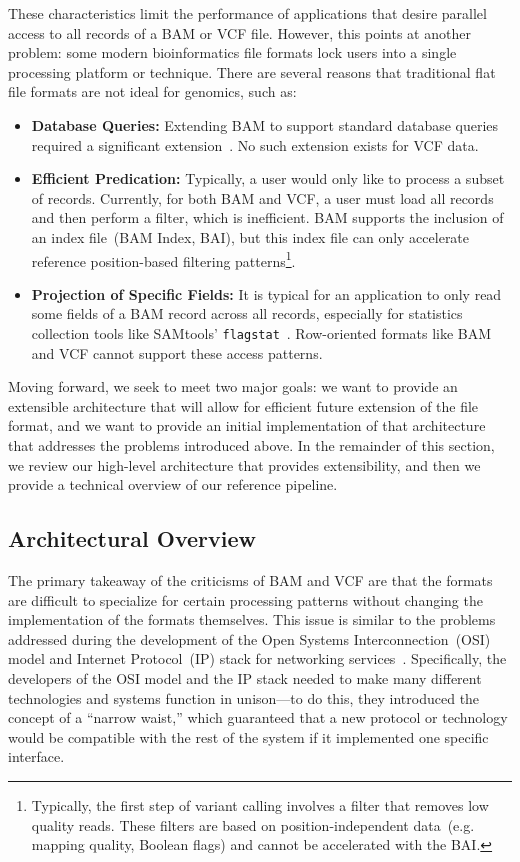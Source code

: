 \documentclass{bioinfo}
\begin{document}
These characteristics limit the performance of applications that desire parallel access to all records of a BAM or VCF file. However,
this points at another problem: some modern bioinformatics file formats lock users into a single processing platform or technique. There are
several reasons that traditional flat file formats are not ideal for genomics, such as:

\begin{itemize}
\item \textbf{Database Queries:} Extending BAM to support standard database queries required a significant extension~\citep{kozanitis13}.
No such extension exists for VCF data.
\item \textbf{Efficient Predication:} Typically, a user would only like to process a subset of records. Currently, for both BAM and VCF, a user must load all
records and then perform a filter, which is inefficient. BAM supports the inclusion of an index file~(BAM Index, BAI), but this index file can only accelerate
reference position-based filtering patterns\footnote{Typically, the first step of variant calling involves a filter that removes low quality reads. These filters
are based on position-independent data~(e.g. mapping quality, Boolean flags) and cannot be accelerated with the BAI.}.
\item \textbf{Projection of Specific Fields:} It is typical for an application to only read some fields of a BAM record across all records, especially for
statistics collection tools like SAMtools' \texttt{flagstat}~\citep{li09}. Row-oriented formats like BAM and VCF cannot support these access patterns.
\end{itemize}

Moving forward, we seek to meet two major goals: we want to provide an extensible architecture that will allow for efficient future extension of the
file format, and we want to provide an initial implementation of that architecture that addresses the problems introduced above. In the remainder
of this section, we review our high-level architecture that provides extensibility, and then we provide a technical overview of our reference pipeline.

\subsection{Architectural Overview}
\label{sec:architectural-overview}

The primary takeaway of the criticisms of BAM and VCF are that the formats are difficult to specialize for certain processing patterns without
changing the implementation of the formats themselves. This issue is similar to the problems addressed during the development of the Open
Systems Interconnection~(OSI) model and Internet Protocol~(IP) stack for networking services~\citep{zimmermann80}. Specifically, the developers
of the OSI model and the IP stack needed to make many different technologies and systems function in unison---to do this, they introduced the
concept of a ``narrow waist,'' which guaranteed that a new protocol or technology would be compatible with the rest of the system if it implemented
one specific interface.
\end{document}
